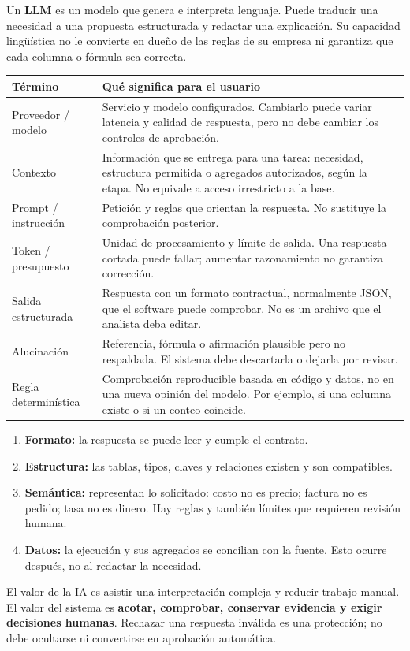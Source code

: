 Un \textbf{LLM} es un modelo que genera e interpreta lenguaje. Puede traducir una necesidad a una propuesta estructurada y redactar una explicación. Su capacidad lingüística no le convierte en dueño de las reglas de su empresa ni garantiza que cada columna o fórmula sea correcta.
\begin{tabularx}{\linewidth}{@{}p{31mm}Y@{}}
\toprule
\textbf{Término}&\textbf{Qué significa para el usuario}\\
\midrule
Proveedor / modelo&Servicio y modelo configurados. Cambiarlo puede variar latencia y calidad de respuesta, pero no debe cambiar los controles de aprobación.\\
Contexto&Información que se entrega para una tarea: necesidad, estructura permitida o agregados autorizados, según la etapa. No equivale a acceso irrestricto a la base.\\
Prompt / instrucción&Petición y reglas que orientan la respuesta. No sustituye la comprobación posterior.\\
Token / presupuesto&Unidad de procesamiento y límite de salida. Una respuesta cortada puede fallar; aumentar razonamiento no garantiza corrección.\\
Salida estructurada&Respuesta con un formato contractual, normalmente JSON, que el software puede comprobar. No es un archivo que el analista deba editar.\\
Alucinación&Referencia, fórmula o afirmación plausible pero no respaldada. El sistema debe descartarla o dejarla por revisar.\\
Regla determinística&Comprobación reproducible basada en código y datos, no en una nueva opinión del modelo. Por ejemplo, si una columna existe o si un conteo coincide.\\
\bottomrule
\end{tabularx}
\begin{enumerate}
\item \textbf{Formato:} la respuesta se puede leer y cumple el contrato.
\item \textbf{Estructura:} las tablas, tipos, claves y relaciones existen y son compatibles.
\item \textbf{Semántica:} representan lo solicitado: costo no es precio; factura no es pedido; tasa no es dinero. Hay reglas y también límites que requieren revisión humana.
\item \textbf{Datos:} la ejecución y sus agregados se concilian con la fuente. Esto ocurre después, no al redactar la necesidad.
\end{enumerate}
\begin{good}
El valor de la IA es asistir una interpretación compleja y reducir trabajo manual. El valor del sistema es \textbf{acotar, comprobar, conservar evidencia y exigir decisiones humanas}. Rechazar una respuesta inválida es una protección; no debe ocultarse ni convertirse en aprobación automática.
\end{good}

